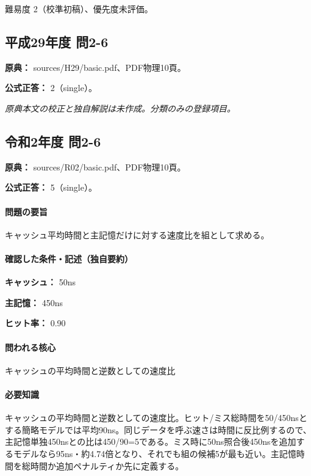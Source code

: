 \par 難易度 2（校準初稿）、優先度未評価。

\subsection{平成29年度 問2-6}
\label{q:h29-reg-basic-2-6}

\noindent\textbf{原典：} sources/H29/basic.pdf、PDF物理10頁。

\textbf{公式正答：} 2（single）。

\par\textit{原典本文の校正と独自解説は未作成。分類のみの登録項目。}

\subsection{令和2年度 問2-6}
\label{q:r02-reg-basic-2-6}

\noindent\textbf{原典：} sources/R02/basic.pdf、PDF物理10頁。

\textbf{公式正答：} 5（single）。

\paragraph{問題の要旨} キャッシュ平均時間と主記憶だけに対する速度比を組として求める。

\paragraph{確認した条件・記述（独自要約）}\mbox{}\par

\noindent\textbf{キャッシュ：} 50ns\par

\noindent\textbf{主記憶：} 450ns\par

\noindent\textbf{ヒット率：} 0.90\par

\paragraph{問われる核心} キャッシュの平均時間と逆数としての速度比

\paragraph{必要知識} キャッシュの平均時間と逆数としての速度比。ヒット/ミス総時間を50/450nsとする簡略モデルでは平均90ns。同じデータを呼ぶ速さは時間に反比例するので、主記憶単独450nsとの比は450/90=\allowbreak{}5である。ミス時に50ns照合後450nsを追加するモデルなら95ns・約4.74倍となり、それでも組の候補5が最も近い。主記憶時間を総時間か追加ペナルティか先に定義する。

